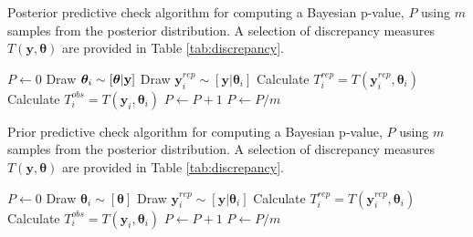 \documentclass[12pt,english]{article}
\begin{document}
\begin{spacing}{1.9}
\begin{algorithm}
\caption{Posterior predictive check algorithm for computing a Bayesian p-value, $P$ using $m$ samples from the posterior distribution.  A selection of discrepancy measures $T(\textbf{y},\boldsymbol{\theta})$ are provided in Table \ref{tab:discrepancy}.}
\label{alg:posterior}
\begin{algorithmic}
\STATE $P \leftarrow 0$
  \STATE Draw $\boldsymbol{\theta}_i \sim [\boldsymbol{\theta}|{\bf y}]$
  \STATE Draw $\textbf{y}_i^{rep} \sim [\textbf{y} | \boldsymbol{\theta}_i]$ \STATE Calculate $T_i^{rep} = T(\textbf{y}_i^{rep},\boldsymbol{\theta}_i)$
  \STATE Calculate $T_i^{obs} = T(\textbf{y}_i,\boldsymbol{\theta}_i)$
    \STATE $P \leftarrow P+1$
  \ENDIF
\ENDFOR
\STATE $P \leftarrow P/m$
\end{algorithmic}
\end{algorithm}

\begin{algorithm}
\caption{Prior predictive check algorithm for computing a Bayesian p-value, $P$ using $m$ samples from the posterior distribution. A selection of discrepancy measures $T(\textbf{y},\boldsymbol{\theta})$ are provided in Table \ref{tab:discrepancy}.}
\label{alg:prior}
\begin{algorithmic}
\STATE $P \leftarrow 0$
  \STATE Draw $\boldsymbol{\theta}_i \sim [\boldsymbol{\theta}]$
  \STATE Draw $\textbf{y}_i^{rep} \sim [\textbf{y} | \boldsymbol{\theta}_i]$ \STATE Calculate $T_i^{rep} = T(\textbf{y}_i^{rep},\boldsymbol{\theta}_i)$
  \STATE Calculate $T_i^{obs} = T(\textbf{y}_i,\boldsymbol{\theta}_i)$
    \STATE $P \leftarrow P+1$
  \ENDIF
\ENDFOR
\STATE $P \leftarrow P/m$
\end{algorithmic}
\end{algorithm}


\end{spacing}
\end{document}
